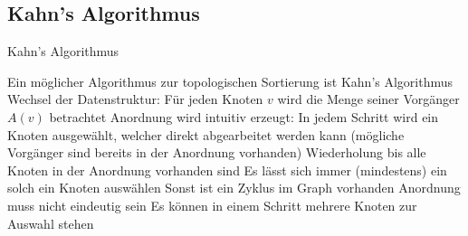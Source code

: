 \documentclass[mathserif]{beamer}
\begin{document}
\subsection{Kahn's Algorithmus}
\begin{frame}{Kahn's Algorithmus}
    \begin{outline}
        \1 Ein möglicher Algorithmus zur topologischen Sortierung ist Kahn's Algorithmus\pause
        \1 Wechsel der Datenstruktur: Für jeden Knoten $v$ wird die Menge seiner Vorgänger $A(v)$ betrachtet\pause
        \1 Anordnung wird intuitiv erzeugt: In jedem Schritt wird ein Knoten ausgewählt, welcher direkt abgearbeitet werden kann (mögliche Vorgänger sind bereits in der Anordnung vorhanden)\pause
        \1 Wiederholung bis alle Knoten in der Anordnung vorhanden sind\pause
        \1 Es lässt sich immer (mindestens) ein solch ein Knoten auswählen
        \2 Sonst ist ein Zyklus im Graph vorhanden\pause
        \1 Anordnung muss nicht eindeutig sein
        \2 Es können in einem Schritt mehrere Knoten zur Auswahl stehen
    \end{outline}
\end{frame}
\end{document}
